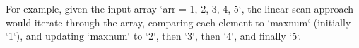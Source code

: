 \documentclass[preview]{standalone}
\begin{document}
For example, given the input array `arr = 1, 2, 3, 4, 5`, the linear scan approach would iterate through the array, comparing each element to `maxnum` (initially `1`), and updating `maxnum` to `2`, then `3`, then `4`, and finally `5`.\\
\end{document}
